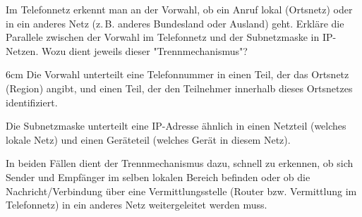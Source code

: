 \question[3]
Im Telefonnetz erkennt man an der Vorwahl, ob ein Anruf lokal (Ortsnetz)
oder in ein anderes Netz (z.\,B. anderes Bundesland oder Ausland) geht.
Erkläre die Parallele zwischen der Vorwahl im Telefonnetz und der Subnetzmaske in IP-Netzen. Wozu dient jeweils dieser "Trennmechanismus"?

\begin{solutionbox}{6cm}
Die Vorwahl unterteilt eine Telefonnummer in einen Teil, der
das Ortsnetz (Region) angibt, und einen Teil, der den
Teilnehmer innerhalb dieses Ortsnetzes identifiziert.

Die Subnetzmaske unterteilt eine IP-Adresse ähnlich in einen
Netzteil (welches lokale Netz) und einen Geräteteil (welches
Gerät in diesem Netz).

In beiden Fällen dient der Trennmechanismus dazu, schnell zu
erkennen, ob sich Sender und Empfänger im selben lokalen
Bereich befinden oder ob die Nachricht/Verbindung über eine
Vermittlungsstelle (Router bzw. Vermittlung im Telefonnetz) in
ein anderes Netz weitergeleitet werden muss.
\end{solutionbox}